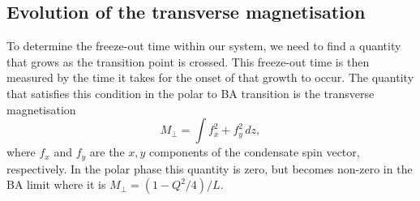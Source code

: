 \subsection{Evolution of the transverse magnetisation}
To determine the freeze-out time within our system, we need to find a quantity
that grows as the transition point is crossed.
This freeze-out time is then measured by the time it takes for the onset of
that growth to occur.
The quantity that satisfies this condition in the polar to BA transition is the
transverse magnetisation
\begin{equation}
    M_\perp = \int f_x^2 + f_y^2 \, dz,
\end{equation}
where \(f_x\) and \(f_y \) are the \(x, y\) components of the condensate spin
vector, respectively.
In the polar phase this quantity is zero, but becomes non-zero in the BA limit
where it is \(M_\perp = (1 - Q^2/4)/L\).
